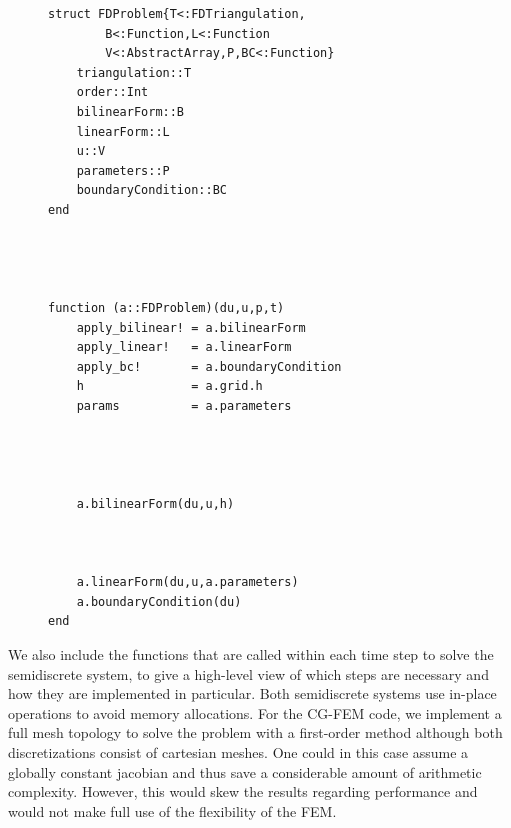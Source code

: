 \documentclass[asi,article,submit,moreauthors]{Definitions/mdpi}
\begin{document}
\begin{figure}[!htbp]
\begin{minipage}[t]{0.5\textwidth}
\begin{verbatim}
struct FDProblem{T<:FDTriangulation,
        B<:Function,L<:Function
        V<:AbstractArray,P,BC<:Function}
    triangulation::T
    order::Int
    bilinearForm::B
    linearForm::L
    u::V
    parameters::P
    boundaryCondition::BC
end




function (a::FDProblem)(du,u,p,t)
    apply_bilinear! = a.bilinearForm
    apply_linear!   = a.linearForm
    apply_bc!       = a.boundaryCondition
    h               = a.grid.h
    params          = a.parameters




    a.bilinearForm(du,u,h)



    a.linearForm(du,u,a.parameters)
    a.boundaryCondition(du)
end
\end{verbatim}
\end{minipage}

\vspace{0.2cm}
\label{lst:ac-code}
\end{figure}

We also include the functions that are called within each time step to solve the semidiscrete system, to give a high-level view of which steps are necessary and how they are implemented in particular. 
Both semidiscrete systems use in-place operations to avoid memory allocations.
For the CG-FEM code, we implement a full mesh topology to solve the problem with a first-order method although both discretizations consist of cartesian meshes.
One could in this case assume a globally constant jacobian and thus save a considerable amount of arithmetic complexity.
However, this would skew the results regarding performance and would not make full use of the flexibility of the FEM.
\end{document}
